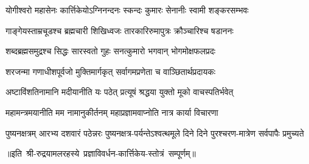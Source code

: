 

\twolineshloka
{योगीश्वरो महासेनः कार्त्तिकेयोऽग्निनन्दनः}
{स्कन्दः कुमारः सेनानीः स्वामी शङ्करसम्भवः}

\twolineshloka
{गाङ्गेयस्ताम्रचूडश्च ब्रह्मचारी शिखिध्वजः}
{तारकारिरुमापुत्रः क्रौञ्चारिश्च षडाननः}

\twolineshloka
{शब्दब्रह्मसमुद्रश्च सिद्धः सारस्वतो गुहः}
{सनत्कुमारो भगवान् भोगमोक्षफलप्रदः}

\twolineshloka
{शरजन्मा गणाधीशपूर्वजो मुक्तिमार्गकृत्}
{सर्वागमप्रणेता च वाञ्छितार्थप्रदायकः}

\twolineshloka
{अष्टाविंशतिनामानि मदीयानीति यः पठेत्}
{प्रत्यूषं श्रद्धया युक्तो मूको वाचस्पतिर्भवेत्}

\twolineshloka
{महामन्त्रमयानीति मम नामानुकीर्तनम्}
{महाप्रज्ञामवाप्नोति नात्र कार्या विचारणा}

\threelineshloka
{पुष्यनक्षत्रम् आरभ्य दशवारं पठेन्नरः}
{पुष्यनक्षत्र-पर्यन्तेऽश्वत्थमूले दिने दिने}
{पुरश्चरण-मात्रेण सर्वपापैः प्रमुच्यते}

॥इति~श्री-रुद्रयामलरहस्ये~प्रज्ञाविवर्धन-कार्त्तिकेय-स्तोत्रं~सम्पूर्णम्॥
